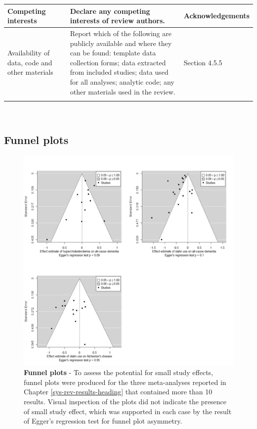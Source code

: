 \documentclass[a4paper, twoside]{templates/ociamthesis}
\begin{document}
\begin{longtable}[t]{>{\raggedright\arraybackslash}p{8.45em}>{\centering\arraybackslash}p{2.1em}>{\raggedright\arraybackslash}p{13.5em}>{\raggedright\arraybackslash}p{7.45em}}
\midrule
\addlinespace
Competing interests & 26 & Declare any competing interests of review authors. & Acknowledgements\\
\midrule
\addlinespace
Availability of data, code and other materials & 27 & Report which of the following are publicly available and where they can be found: template data collection forms; data extracted from included studies; data used for all analyses; analytic code; any other materials used in the review. & Section 4.5.5\\*
\end{longtable}


~

\hypertarget{appendix-funnel-plots}{%
\subsection{Funnel plots}\label{appendix-funnel-plots}}





\begin{figure}[H]
\includegraphics[width=1\linewidth]{figures/appendix/funnel_composite} \caption[Funnel plots]{\textbf{Funnel plots} - To assess the potential for small study effects, funnel plots were produced for the three meta-analyses reported in Chapter \ref{sys-rev-results-heading} that contained more than 10 results. Visual inspection of the plots did not indicate the presence of small study effect, which was supported in each case by the result of Egger's regression test for funnel plot asymmetry.}\label{fig:funnerlPlots}
\end{figure}
\end{document}
